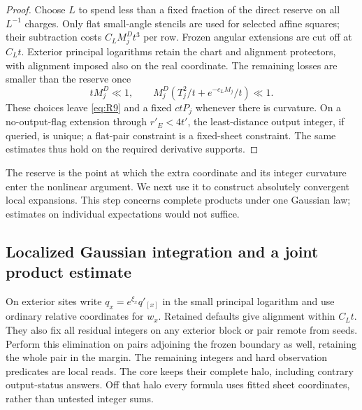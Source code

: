 \begin{proof}
Choose $L$ to spend less than a fixed fraction of the direct reserve
on all $L^{-1}$ charges.  Only flat small-angle stencils are used for
selected affine squares; their subtraction costs
$C_LM_j^Dt^3$ per row.  Frozen angular extensions are cut off at
$C_Lt$.  Exterior principal logarithms retain the chart and alignment
protectors, with alignment imposed also on the real coordinate.
The remaining losses are smaller than the reserve once
\[
 tM_j^D\ll1,
 \qquad M_j^D(T_j^2/t+e^{-c_LM_j}/t)\ll1.
\]
These choices leave \eqref{eq:R9} and a fixed $ctP_j$ whenever there is
curvature.  On a no-output-flag extension through $r'_E<4t'$, the
least-distance output integer, if queried, is unique; a flat-pair
constraint is a fixed-sheet constraint.  The same estimates thus hold
on the required derivative supports.
\end{proof}

The reserve is the point at which the extra coordinate and its integer
curvature enter the nonlinear argument.  We next use it to construct
absolutely convergent local expansions.  This step concerns complete
products under one Gaussian law; estimates on individual expectations
would not suffice.

\subsection{Localized Gaussian integration and a joint product estimate}

On exterior sites write $q_x=e^{\xi_x}q'_{[x]}$ in the small principal
logarithm and use ordinary relative coordinates for $w_x$.  Retained
defaults give alignment within $C_Lt$.  They also fix all residual
integers on any exterior block or pair remote from seeds.  Perform this
elimination on pairs adjoining the frozen boundary as well, retaining
the whole pair in the margin.  The remaining integers and hard
observation predicates are local reads.  The core keeps their complete
halo, including contrary output-status answers.  Off that halo every
formula uses fitted sheet coordinates, rather than untested integer
sums.

